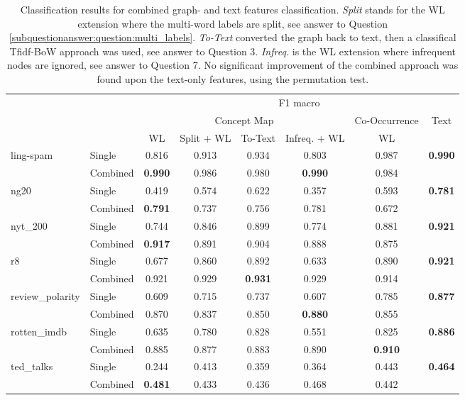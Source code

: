 \begin{table}[htb!]
\centering
\begin{tabular}{ll|cccc|c|c}
	\toprule
	& & \multicolumn{6}{c}{F1 macro} \\
	&  & \multicolumn{4}{c|}{Concept Map} & Co-Occurrence &  Text \\
	&  &   WL & Split + WL & To-Text & Infreq. + WL &  WL &    \\
	\midrule
ling-spam & Single & 0.816 & 0.913 & 0.934 & 0.803 & 0.987 & \textbf{0.990} \\
& Combined & \textbf{0.990} & 0.986 & 0.980 & \textbf{0.990} & 0.984 &\\
\midrule
ng20 & Single & 0.419 & 0.574 & 0.622 & 0.357 & 0.593 & \textbf{0.781} \\
& Combined & \textbf{0.791} & 0.737 & 0.756 & 0.781 & 0.672 &\\
\midrule
nyt\_200 & Single & 0.744 & 0.846 & 0.899 & 0.774 & 0.881 & \textbf{0.921} \\
& Combined & \textbf{0.917} & 0.891 & 0.904 & 0.888 & 0.875 &\\
\midrule
r8 & Single & 0.677 & 0.860 & 0.892 & 0.633 & 0.890 & \textbf{0.921} \\
& Combined & 0.921 & 0.929 & \textbf{0.931} & 0.929 & 0.914 &\\
\midrule
review\_polarity & Single & 0.609 & 0.715 & 0.737 & 0.607 & 0.785 & \textbf{0.877} \\
& Combined & 0.870 & 0.837 & 0.850 & \textbf{0.880} & 0.855 &\\
\midrule
rotten\_imdb & Single & 0.635 & 0.780 & 0.828 & 0.551 & 0.825 & \textbf{0.886} \\
& Combined & 0.885 & 0.877 & 0.883 & 0.890 & \textbf{0.910} &\\
\midrule
ted\_talks & Single & 0.244 & 0.413 & 0.359 & 0.364 & 0.443 & \textbf{0.464} \\
& Combined & \textbf{0.481} & 0.433 & 0.436 & 0.468 & 0.442 &\\
	\bottomrule
\end{tabular}
\caption[Results: Combined text- and graph features]{Classification results for combined graph- and text features classification.
\textit{Split} stands for the WL extension where the multi-word labels are split, see answer to Question \ref{subquestionanswer:question:multi_labels}.
\textit{To-Text} converted the graph back to text, then a classifical Tfidf-BoW approach was used, see answer to Question 3.
\textit{Infreq.} is the WL extension where infrequent nodes are ignored, see answer to Question 7.
No significant improvement of the combined approach was found upon the text-only features, using the permutation test.
}%
\label{table:results_comparison_combined}
\end{table}

